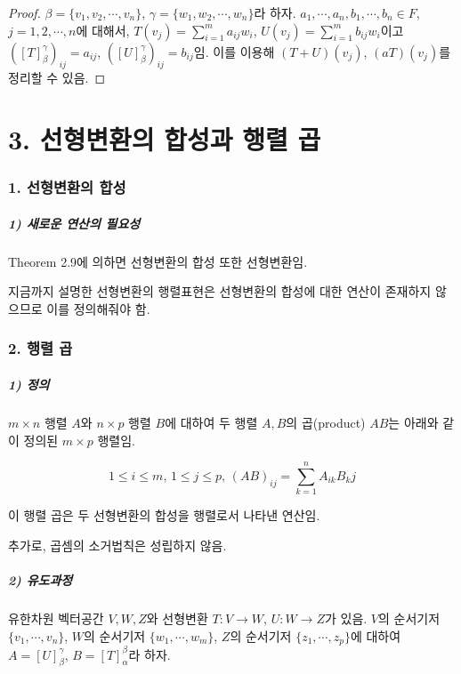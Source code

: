 \documentclass[10pt, a4paper]{article}
\begin{document}
\begin{proof}
$\beta = \{v_1,v_2, \cdots ,v_n\}$, $\gamma = \{w_1,w_2, \cdots ,w_n\}$라 하자. $a_1, \cdots ,a_n, b_1, \cdots ,b_n \in F$, $j=1,2, \cdots ,n$에 대해서, $T(v_j)=\sum_{i=1}^{m}{a_{ij}w_i}$, $U(v_j)=\sum_{i=1}^{m}{b_{ij}w_i}$이고 $([T]_{\beta}^{\gamma})_{ij}=a_{ij}$, $([U]_{\beta}^{\gamma})_{ij}=b_{ij}$임. 이를 이용해 $(T+U)(v_j)$, $(aT)(v_j)$를 정리할 수 있음.
\end{proof}


\newpage


\part*{3. 선형변환의 합성과 행렬 곱}

\section*{1. 선형변환의 합성}

\subsubsection*{1) 새로운 연산의 필요성}
Theorem 2.9에 의하면 선형변환의 합성 또한 선형변환임.

지금까지 설명한 선형변환의 행렬표현은 선형변환의 합성에 대한 연산이 존재하지 않으므로 이를 정의해줘야 함.\\


\section*{2. 행렬 곱}

\subsubsection*{1) 정의}
$m \times n$ 행렬 $A$와 $n \times p$ 행렬 $B$에 대하여 두 행렬 $A,B$의 곱(product) $AB$는 아래와 같이 정의된 $m \times p$ 행렬임.

\[
1 \leq i \leq m,\,1 \leq j \leq p,\,(AB)_{ij}= \sum^{n}_{k=1}A_{ik}B_kj
\]

이 행렬 곱은 두 선형변환의 합성을 행렬로서 나타낸 연산임.

추가로, 곱셈의 소거법칙은 성립하지 않음.

\subsubsection*{2) 유도과정}
유한차원 벡터공간 $V,W,Z$와 선형변환 $T:V \rightarrow W$, $U:W \rightarrow Z$가 있음. $V$의 순서기저 $\{v_1, \cdots , v_n\}$, $W$의 순서기저 $\{w_1, \cdots , w_m\}$, $Z$의 순서기저 $\{z_1, \cdots , z_p\}$에 대하여 $A=[U]^{\gamma}_{\beta}$, $B=[T]^{\beta}_{\alpha}$라 하자.
\end{document}
